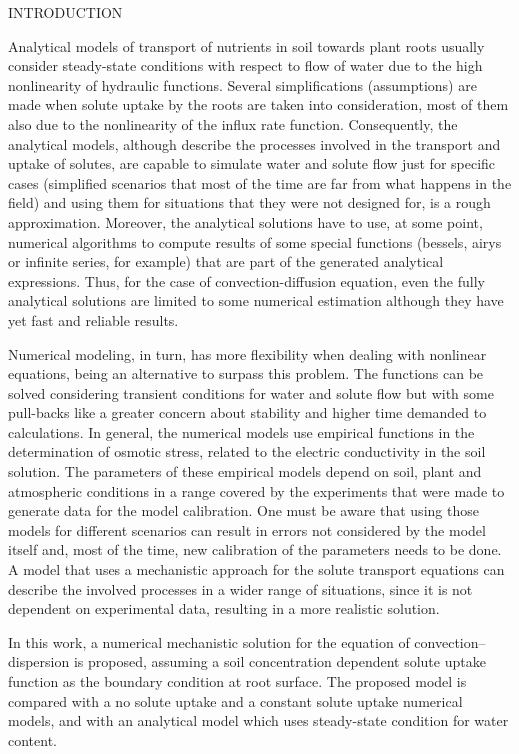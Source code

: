 \cleardoublepage
\chap INTRODUCTION

Analytical models of transport of nutrients in soil towards plant roots usually consider steady-state conditions with respect to flow of water due to the high nonlinearity of hydraulic functions. 
Several simplifications (assumptions) are made when solute uptake by the roots are taken into consideration, most of them also due to the nonlinearity of the influx rate function. 
Consequently, the analytical models, although describe the processes involved in the transport and uptake of solutes, are capable to simulate water and solute flow just for specific cases (simplified scenarios that most of the time are far from what happens in the field) and using them for situations that they were not designed for, is a rough approximation.
Moreover, the analytical solutions have to use, at some point, numerical algorithms to compute results of some special functions (bessels, airys or infinite series, for example) that are part of the generated analytical expressions. Thus, for the case of convection-diffusion equation, even the fully analytical solutions are limited to some numerical estimation although they have yet fast and reliable results.

Numerical modeling, in turn, has more flexibility when dealing with nonlinear equations, being an alternative to surpass this problem. The functions can be solved considering transient conditions for water and solute flow but with some pull-backs like a greater concern about stability and higher time demanded to calculations.
In general, the numerical models use empirical functions in the determination of osmotic stress, related to the electric conductivity in the soil solution. The parameters of these empirical models depend on soil, plant and atmospheric conditions in a range covered by the experiments that were made to generate data for the model calibration. One must be aware that using those models for different scenarios can result in errors not considered by the model itself and, most of the time, new calibration of the parameters needs to be done.
A model that uses a mechanistic approach for the solute transport equations can describe the involved processes in a wider range of situations, since it is not dependent on experimental data, resulting in a more realistic solution.

In this work, a numerical mechanistic solution for the equation of convection--dispersion is proposed, assuming a soil concentration dependent solute uptake function as the boundary condition at root surface. The proposed model is compared with a no solute uptake and a constant solute uptake numerical models, and with an analytical model which uses steady-state condition for water content. 


